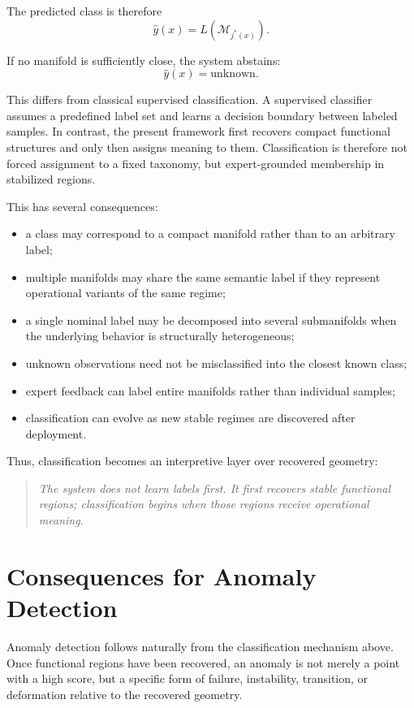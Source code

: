 \documentclass[11pt,a4paper]{article}
\begin{document}
The predicted class is therefore
\begin{equation}
\hat{y}(x) = L\left(\mathcal{M}_{j^*(x)}\right).
\end{equation}

If no manifold is sufficiently close, the system abstains:
\begin{equation}
\hat{y}(x) = \mathrm{unknown}.
\end{equation}

This differs from classical supervised classification. A supervised classifier assumes a predefined label set and learns a decision boundary between labeled samples. In contrast, the present framework first recovers compact functional structures and only then assigns meaning to them. Classification is therefore not forced assignment to a fixed taxonomy, but expert-grounded membership in stabilized regions.

This has several consequences:

\begin{itemize}[leftmargin=*]
\item a class may correspond to a compact manifold rather than to an arbitrary label;
\item multiple manifolds may share the same semantic label if they represent operational variants of the same regime;
\item a single nominal label may be decomposed into several submanifolds when the underlying behavior is structurally heterogeneous;
\item unknown observations need not be misclassified into the closest known class;
\item expert feedback can label entire manifolds rather than individual samples;
\item classification can evolve as new stable regimes are discovered after deployment.
\end{itemize}

Thus, classification becomes an interpretive layer over recovered geometry:

\begin{quote}
\emph{The system does not learn labels first. It first recovers stable functional regions; classification begins when those regions receive operational meaning.}
\end{quote}

\section{Consequences for Anomaly Detection}
Anomaly detection follows naturally from the classification mechanism above. 
Once functional regions have been recovered, an anomaly is not merely a point 
with a high score, but a specific form of failure, instability, transition, or 
deformation relative to the recovered geometry.
\end{document}
